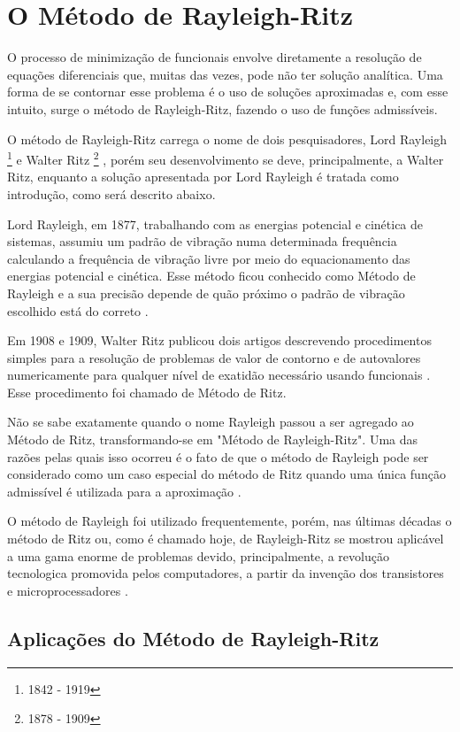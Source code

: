 \documentclass[
	12pt,				%
	openright,			%
    twoside,			%
	a4paper,			%
	english,			%
	french,				%
	spanish,			%
	brazil				%
	]{abntex2}
\numberwithin{lema}{chapter}
\numberwithin{teorema}{chapter}
\numberwithin{definicao}{chapter}
\numberwithin{exemplo}{chapter}
\numberwithin{figure}{chapter}
\newcommand{\bdDate}[2]{
	\footnote{\gtrsymBorn\text{ }#1 - \gtrsymDied\text{ }#2}
}
\begin{document}
\section{O Método de Rayleigh-Ritz}

O processo de minimização de funcionais envolve diretamente a resolução de equações diferenciais que, muitas das vezes, pode não ter solução analítica. Uma forma de se contornar esse problema é o uso de soluções aproximadas e, com esse intuito, surge o método de Rayleigh-Ritz, fazendo o uso de funções admissíveis.

O método de Rayleigh-Ritz carrega o nome de dois pesquisadores, Lord Rayleigh\bdDate{1842}{1919} e Walter Ritz\bdDate{1878}{1909}, porém seu desenvolvimento se deve, principalmente, a Walter Ritz, enquanto a solução apresentada por Lord Rayleigh é tratada como introdução, como será descrito abaixo.

Lord Rayleigh, em 1877, trabalhando com as energias potencial e cinética de sistemas, assumiu um padrão de vibração numa determinada frequência calculando a frequência de vibração livre por meio do equacionamento das energias potencial e cinética. Esse método ficou conhecido como Método de Rayleigh e a sua precisão depende de quão próximo o padrão de vibração escolhido está do correto \cite{LEISSA_2005}.

Em 1908 e 1909, Walter Ritz publicou dois artigos descrevendo procedimentos simples para a resolução de problemas de valor de contorno e de autovalores numericamente para qualquer nível de exatidão necessário usando funcionais \cite{LEISSA_2005}. Esse procedimento foi chamado de Método de Ritz.

Não se sabe exatamente quando o nome Rayleigh passou a ser agregado ao Método de Ritz, transformando-se em "Método de Rayleigh-Ritz". Uma das razões pelas quais isso ocorreu é o fato de que o método de Rayleigh pode ser considerado como um caso especial do método de Ritz quando uma única função admissível é utilizada para a aproximação \cite{LEISSA_2005}.

O método de Rayleigh foi utilizado frequentemente, porém, nas últimas décadas o método de Ritz ou, como é chamado hoje, de Rayleigh-Ritz se mostrou aplicável a uma gama enorme de problemas devido, principalmente, a revolução tecnologica promovida pelos computadores, a partir da invenção dos transistores e microprocessadores \cite{LEISSA_2005}.

\subsection{Aplicações do Método de Rayleigh-Ritz}
\end{document}
